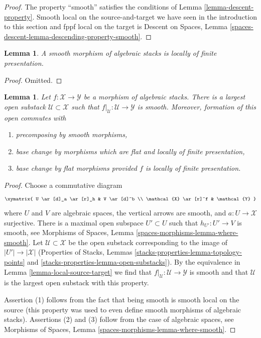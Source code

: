 \documentclass{stacks-project}
\theoremstyle{plain}
\newtheorem{lemma}[subsection]{Lemma}
\theoremstyle{definition}
\theoremstyle{remark}
\numberwithin{equation}{subsection}
\begin{document}
\begin{proof}
The property ``smooth''
satisfies the conditions of Lemma \ref{lemma-descent-property}.
Smooth local on the source-and-target we have seen in the
introduction to this section and fppf local on the target is
Descent on Spaces, Lemma
\ref{spaces-descent-lemma-descending-property-smooth}.
\end{proof}

\begin{lemma}
\label{lemma-smooth-locally-finite-presentation}
A smooth morphism of algebraic stacks is locally of finite presentation.
\end{lemma}

\begin{proof}
Omitted.
\end{proof}

\begin{lemma}
\label{lemma-where-smooth}
Let $f : \mathcal{X} \to \mathcal{Y}$ be a morphism of algebraic stacks.
There is a largest open substack $\mathcal{U} \subset \mathcal{X}$
such that $f|_\mathcal{U} : \mathcal{U} \to \mathcal{Y}$ is smooth.
Moreover, formation of this open commutes with
\begin{enumerate}
\item precomposing by smooth morphisms,
\item base change by morphisms which are flat and locally of
finite presentation,
\item base change by flat morphisms provided $f$ is locally of
finite presentation.
\end{enumerate}
\end{lemma}

\begin{proof}
Choose a commutative diagram
$$
\xymatrix{
U \ar[d]_a \ar[r]_h & V \ar[d]^b \\
\mathcal{X} \ar[r]^f & \mathcal{Y}
}
$$
where $U$ and $V$ are algebraic spaces, the vertical arrows are smooth,
and $a : U \to \mathcal{X}$ surjective. There is a maximal open subspace
$U' \subset U$ such that $h_{U'} : U' \to V$ is smooth, see
Morphisms of Spaces, Lemma \ref{spaces-morphisms-lemma-where-smooth}.
Let $\mathcal{U} \subset \mathcal{X}$ be the open substack
corresponding to the image of $|U'| \to |\mathcal{X}|$
(Properties of Stacks, Lemmas \ref{stacks-properties-lemma-topology-points} and
\ref{stacks-properties-lemma-open-substacks}).
By the equivalence in Lemma \ref{lemma-local-source-target}
we find that $f|_\mathcal{U} : \mathcal{U} \to \mathcal{Y}$ is smooth
and that $\mathcal{U}$ is the largest open substack with this
property.

\medskip\noindent
Assertion (1) follows from the fact that being smooth
is smooth local on the source (this property was used to even define
smooth morphisms of algebraic stacks).
Assertions (2) and (3) follow from the case of algebraic spaces, see
Morphisms of Spaces, Lemma \ref{spaces-morphisms-lemma-where-smooth}.
\end{proof}
\end{document}
